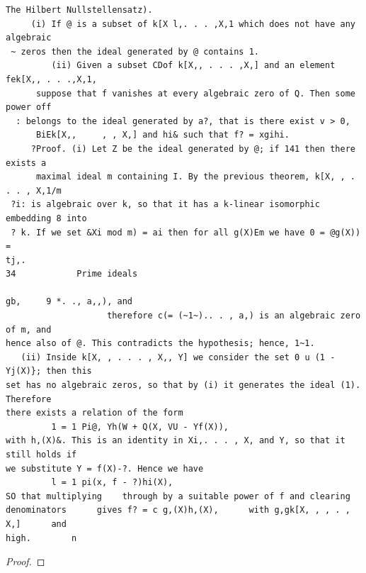 \begin{theorem}\label{mcrt-auto-theorem-5-4}\uses{}
\begin{verbatim}
The Hilbert Nullstellensatz).
     (i) If @ is a subset of k[X l,. . . ,X,1 which does not have any algebraic
 ~ zeros then the ideal generated by @ contains 1.
         (ii) Given a subset CDof k[X,, . . . ,X,] and an element fek[X,, . . .,X,1,
      suppose that f vanishes at every algebraic zero of Q. Then some power off
  : belongs to the ideal generated by a?, that is there exist v > 0,
      BiEk[X,,     , , X,] and hi& such that f? = xgihi.
     ?Proof. (i) Let Z be the ideal generated by @; if 141 then there exists a
      maximal ideal m containing I. By the previous theorem, k[X, , . . . , X,1/m
 ?i: is algebraic over k, so that it has a k-linear isomorphic embedding 8 into
 ? k. If we set &Xi mod m) = ai then for all g(X)Em we have 0 = @g(X)) =
tj,.
34            Prime ideals

gb,     9 *. ., a,,), and
                    therefore c(= (~1~).. . , a,) is an algebraic zero of m, and
hence also of @. This contradicts the hypothesis; hence, 1~1.
   (ii) Inside k[X, , . . . , X,, Y] we consider the set 0 u (1 - Yj(X)}; then this
set has no algebraic zeros, so that by (i) it generates the ideal (1). Therefore
there exists a relation of the form
         1 = 1 Pi@, Yh(W + Q(X, VU - Yf(X)),
with h,(X)&. This is an identity in Xi,. . . , X, and Y, so that it still holds if
we substitute Y = f(X)-?. Hence we have
         l = 1 pi(x, f - ?)hi(X),
SO that multiplying    through by a suitable power of f and clearing
denominators      gives f? = c g,(X)h,(X),      with g,gk[X, , , . , X,]      and
high.        n
\end{verbatim}
\end{theorem}
\begin{proof}
\notready
\end{proof}


